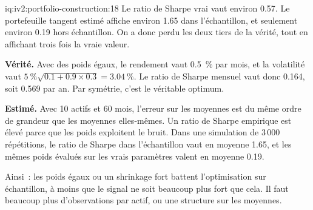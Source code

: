 \begin{solution}{iq:iv2:portfolio-construction:18}
Le ratio de Sharpe vrai vaut environ 0.57. Le portefeuille tangent estimé affiche environ 1.65 dans l'échantillon, et seulement environ 0.19 hors échantillon. On a donc perdu les deux tiers de la vérité, tout en affichant trois fois la vraie valeur.

\begin{sloppypar}\textbf{Vérité.} Avec des poids égaux, le rendement vaut 0.5~\% par mois, et la volatilité vaut $5~\%\sqrt{0.1 + 0.9 \times 0.3} = 3.04~\%$. Le ratio de Sharpe mensuel vaut donc 0.164, soit 0.569 par an. Par symétrie, c'est le véritable optimum.\end{sloppypar}

\textbf{Estimé.} Avec 10 actifs et 60 mois, l'erreur sur les moyennes est du même ordre de grandeur que les moyennes elles-mêmes. Un ratio de Sharpe empirique est élevé parce que les poids exploitent le bruit. Dans une simulation de 3\,000 répétitions, le ratio de Sharpe dans l'échantillon vaut en moyenne 1.65, et les mêmes poids évalués sur les vrais paramètres valent en moyenne 0.19.

Ainsi~: les poids égaux ou un shrinkage fort battent l'optimisation sur échantillon, à moins que le signal ne soit beaucoup plus fort que cela. Il faut beaucoup plus d'observations par actif, ou une structure sur les moyennes.

\end{solution}

